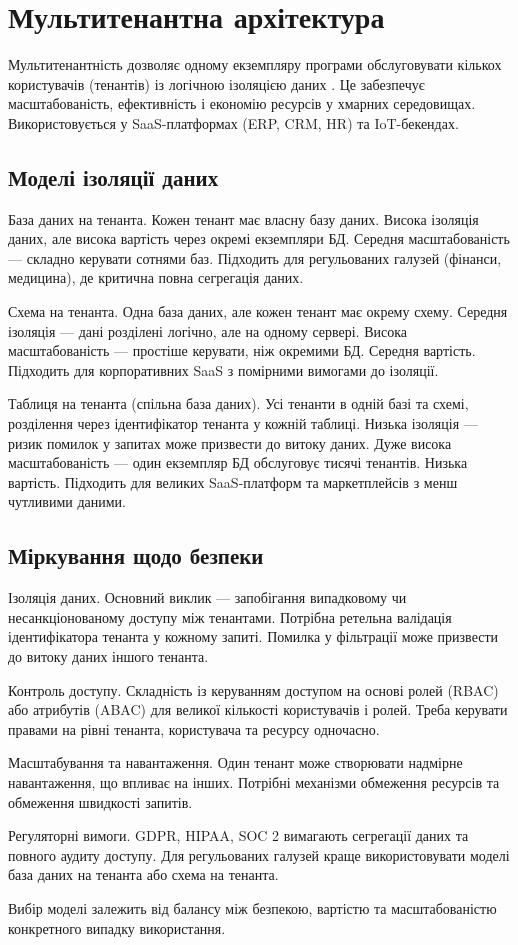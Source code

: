 \section{Мультитенантна архітектура}

Мультитенантність дозволяє одному екземпляру програми обслуговувати кількох користувачів (тенантів) із логічною ізоляцією даних \cite{kumar2020multi}. Це забезпечує масштабованість, ефективність і економію ресурсів у хмарних середовищах. Використовується у SaaS-платформах (ERP, CRM, HR) та IoT-бекендах.

\subsection{Моделі ізоляції даних}

База даних на тенанта. Кожен тенант має власну базу даних. Висока ізоляція даних, але висока вартість через окремі екземпляри БД. Середня масштабованість --- складно керувати сотнями баз. Підходить для регульованих галузей (фінанси, медицина), де критична повна сегрегація даних.

Схема на тенанта. Одна база даних, але кожен тенант має окрему схему. Середня ізоляція --- дані розділені логічно, але на одному сервері. Висока масштабованість --- простіше керувати, ніж окремими БД. Середня вартість. Підходить для корпоративних SaaS з помірними вимогами до ізоляції.

Таблиця на тенанта (спільна база даних). Усі тенанти в одній базі та схемі, розділення через ідентифікатор тенанта у кожній таблиці. Низька ізоляція --- ризик помилок у запитах може призвести до витоку даних. Дуже висока масштабованість --- один екземпляр БД обслуговує тисячі тенантів. Низька вартість. Підходить для великих SaaS-платформ та маркетплейсів з менш чутливими даними.

\subsection{Міркування щодо безпеки}

Ізоляція даних. Основний виклик --- запобігання випадковому чи несанкціонованому доступу між тенантами. Потрібна ретельна валідація ідентифікатора тенанта у кожному запиті. Помилка у фільтрації може призвести до витоку даних іншого тенанта.

Контроль доступу. Складність із керуванням доступом на основі ролей (RBAC) або атрибутів (ABAC) для великої кількості користувачів і ролей. Треба керувати правами на рівні тенанта, користувача та ресурсу одночасно.

Масштабування та навантаження. Один тенант може створювати надмірне навантаження, що впливає на інших. Потрібні механізми обмеження ресурсів та обмеження швидкості запитів.

Регуляторні вимоги. GDPR, HIPAA, SOC 2 вимагають сегрегації даних та повного аудиту доступу. Для регульованих галузей краще використовувати моделі база даних на тенанта або схема на тенанта.

Вибір моделі залежить від балансу між безпекою, вартістю та масштабованістю конкретного випадку використання.

